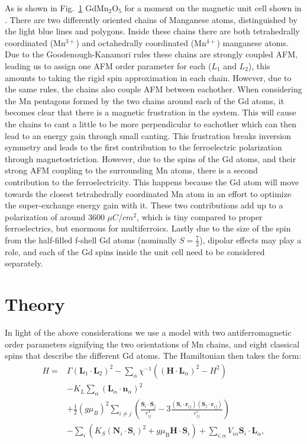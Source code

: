 As is shown in Fig.~\ref{fig:GdMn2O5_unit_cell}   GdMn$_2$O$_5$ for a moment on the magnetic unit cell shown in . There are two differently oriented chains of Manganese atoms, distinguished by the light blue lines and polygons. Inside these chains there are both tetrahedrally coordinated (Mn$^{3+}$) and octahedrally coordinated (Mn$^{4+}$) manganese atoms. Due to the Goodenough-Kanamori rules these chains are strongly coupled AFM, leading us to assign one AFM order parameter for each ($L_1$ and $L_2$), this amounts to taking the rigid spin approximation in each chain. However, due to the same rules, the chains also couple AFM between eachother. When considering the Mn pentagons formed by the two chains around each of the Gd atoms, it becomes clear that there is a magnetic frustration in the system. This will cause the chains to cant a little to be more perpendicular to eachother which can then lead to an energy gain through small canting. This frustration breaks inversion symmetry and leads to the first contribution to the ferroelectric polarization through magnetostriction. However, due to the spins of the Gd atoms, and their strong AFM coupling to the surrounding Mn atoms, there is a second contribution to the ferroelectricity. This happens because the Gd atom will move towards the closest tetrahedrally coordinated Mn atom in an effort to optimize the super-exchange energy gain with it. These two contributions add up to a polarization of around 3600 $\mu C/cm^2$, which is tiny compared to proper ferroelectrics, but enormous for multiferroics. Lastly due to the size of the spin from the half-filled f-shell Gd atoms (nominally $S=\frac{7}{2}$), dipolar effects may play a role, and each of the Gd spins inside the unit cell need to be considered separately. 
\begin{figure}
	\caption{\label{fig:GdMn2O5_unit_cell}}
\end{figure}

\section{Theory}
In light of the above considerations we use a model with two antiferromagnetic order parameters signifying the two orientations of Mn chains, and eight classical spins that describe the different Gd atoms. The Hamiltonian then takes the form:
\begin{align}
    \label{eq:GdMn2O5_1}
    H=&\Gamma(\mathbf{L}_1\cdot \mathbf{L}_2)^2
    -\sum_{\alpha}\chi^{-1}((\mathbf{H}\cdot \mathbf{L}_\alpha)^2-H^2)\\
    &-K_L\sum_\alpha(\mathbf{L}_\alpha\cdot \mathbf{n}_\alpha)^2\\
    &+\frac{1}{2}(g \mu_B)^2\sum_{i\neq j}\left(\frac{\mathbf{S}_i\cdot \mathbf{S}_j}{r_{ij}^3}-3\frac{(\mathbf{S}_i\cdot \mathbf{r}_{ij})(\mathbf{S}_j\cdot \mathbf{r}_{ij})}{r_{ij}^5}\right)\\
    &-\sum_i\left( K_S(\mathbf{N}_i\cdot \mathbf{S}_i)^2 + g\mu_\mathrm{B} \mathbf{H} \cdot \mathbf{S}_i\right) + \sum_{i,\alpha}V_{i\alpha}\mathbf{S}_i\cdot \mathbf{L}_\alpha,
\end{align}

